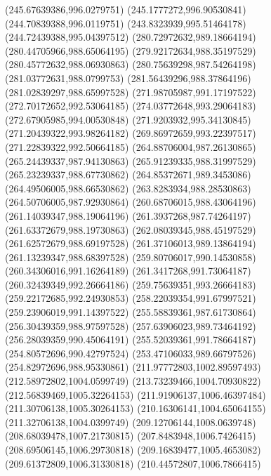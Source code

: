 {{		\lineto(245.67639386,996.0279751)
		\lineto(245.1777272,996.90530841)
		\lineto(244.70839388,996.0119751)
		\lineto(243.8323939,995.51464178)
		\lineto(244.72439388,995.04397512)
		\closepath
		\moveto(280.72972632,989.18664194)
		\lineto(280.44705966,988.65064195)
		\lineto(279.92172634,988.35197529)
		\lineto(280.45772632,988.06930863)
		\lineto(280.75639298,987.54264198)
		\lineto(281.03772631,988.0799753)
		\lineto(281.56439296,988.37864196)
		\lineto(281.02839297,988.65997528)
		\closepath
		\moveto(271.98705987,991.17197522)
		\lineto(272.70172652,992.53064185)
		\lineto(274.03772648,993.29064183)
		\lineto(272.67905985,994.00530848)
		\lineto(271.9203932,995.34130845)
		\lineto(271.20439322,993.98264182)
		\lineto(269.86972659,993.22397517)
		\lineto(271.22839322,992.50664185)
		\closepath
		\moveto(264.88706004,987.26130865)
		\lineto(265.24439337,987.94130863)
		\lineto(265.91239335,988.31997529)
		\lineto(265.23239337,988.67730862)
		\lineto(264.85372671,989.3453086)
		\lineto(264.49506005,988.66530862)
		\lineto(263.8283934,988.28530863)
		\lineto(264.50706005,987.92930864)
		\closepath
		\moveto(260.68706015,988.43064196)
		\lineto(261.14039347,988.19064196)
		\lineto(261.3937268,987.74264197)
		\lineto(261.63372679,988.19730863)
		\lineto(262.08039345,988.45197529)
		\lineto(261.62572679,988.69197528)
		\lineto(261.37106013,989.13864194)
		\lineto(261.13239347,988.68397528)
		\closepath
		\moveto(259.80706017,990.14530858)
		\lineto(260.34306016,991.16264189)
		\lineto(261.3417268,991.73064187)
		\lineto(260.32439349,992.26664186)
		\lineto(259.75639351,993.26664183)
		\lineto(259.22172685,992.24930853)
		\lineto(258.22039354,991.67997521)
		\lineto(259.23906019,991.14397522)
		\closepath
		\moveto(255.58839361,987.61730864)
		\lineto(256.30439359,988.97597528)
		\lineto(257.63906023,989.73464192)
		\lineto(256.28039359,990.45064191)
		\lineto(255.52039361,991.78664187)
		\lineto(254.80572696,990.42797524)
		\lineto(253.47106033,989.66797526)
		\lineto(254.82972696,988.95330861)
		\closepath
		\moveto(211.97772803,1002.89597493)
		\lineto(212.58972802,1004.0599749)
		\lineto(213.73239466,1004.70930822)
		\lineto(212.56839469,1005.32264153)
		\lineto(211.91906137,1006.46397484)
		\lineto(211.30706138,1005.30264153)
		\lineto(210.16306141,1004.65064155)
		\lineto(211.32706138,1004.0399749)
		\closepath
		\moveto(209.12706144,1008.0639748)
		\lineto(208.68039478,1007.21730815)
		\lineto(207.8483948,1006.7426415)
		\lineto(208.69506145,1006.29730818)
		\lineto(209.16839477,1005.4653082)
		\lineto(209.61372809,1006.31330818)
		\lineto(210.44572807,1006.7866415)
}}
